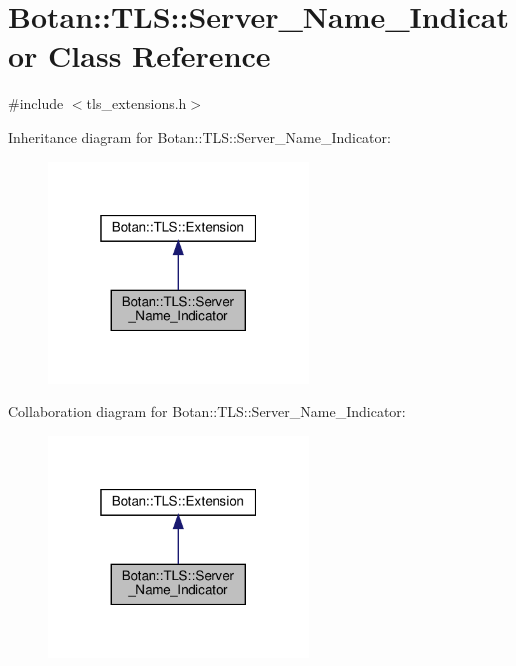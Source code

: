 \hypertarget{class_botan_1_1_t_l_s_1_1_server___name___indicator}{}\section{Botan\+:\+:T\+LS\+:\+:Server\+\_\+\+Name\+\_\+\+Indicator Class Reference}
\label{class_botan_1_1_t_l_s_1_1_server___name___indicator}


{\ttfamily \#include $<$tls\+\_\+extensions.\+h$>$}



Inheritance diagram for Botan\+:\+:T\+LS\+:\+:Server\+\_\+\+Name\+\_\+\+Indicator\+:
\nopagebreak
\begin{figure}[H]
\begin{center}
\leavevmode
\includegraphics[width=196pt]{class_botan_1_1_t_l_s_1_1_server___name___indicator__inherit__graph}
\end{center}
\end{figure}


Collaboration diagram for Botan\+:\+:T\+LS\+:\+:Server\+\_\+\+Name\+\_\+\+Indicator\+:
\nopagebreak
\begin{figure}[H]
\begin{center}
\leavevmode
\includegraphics[width=196pt]{class_botan_1_1_t_l_s_1_1_server___name___indicator__coll__graph}
\end{center}
\end{figure}

